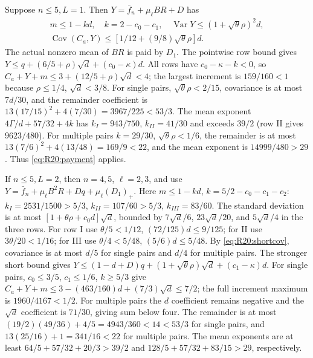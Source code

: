 Suppose $n\le5,L=1$. Then
$Y=\bar f_n+\mu_\ell BR+D$ has
\[
\begin{gathered}
m\le1-kd,\quad k=2-c_0-c_1,\quad \operatorname{Var}Y\le(1+\sqrt\theta\rho)^2d,\\
\operatorname{Cov}(C_a,Y)\le[1/12+(9/8)\sqrt\theta\rho]d.
\end{gathered}
\]
The actual nonzero mean of $BR$ is paid by $D_1$.
The pointwise row bound gives
$Y\le q+(6/5+\rho)\sqrt d+(c_0-\kappa)d$.
All rows have $c_0-\kappa-k<0$, so
$C_a+Y+m\le3+(12/5+\rho)\sqrt d<4$; the largest increment is
$159/160<1$ because $\rho\le1/4$, $\sqrt d<3/8$.
For single pairs, $\sqrt\theta\rho<2/15$, covariance is at most
$7d/30$, and the remainder coefficient is
$13(17/15)^2+4(7/30)=3967/225<53/3$.
The mean exponent $4\Gamma/d+57/32+4k$ has $k_I=943/750$,
$k_{II}=41/30$ and exceeds $39/2$ (row II gives $9623/480$).
For multiple pairs $k=29/30$, $\sqrt\theta\rho<1/6$,
the remainder is at most $13(7/6)^2+4(13/48)=169/9<22$,
and the mean exponent is $14999/480>29$.
Thus \eqref{eq:R20:payment} applies.

If $n\le5,L=2$, then $n=4,5$, $\ell=2,3$, and use
$Y=\bar f_n+\mu_\ell B^2R+Dq+\mu_\ell(D_1)_+$.
Here $m\le1-kd$, $k=5/2-c_0-c_1-c_2$:
$k_I=2531/1500>5/3$, $k_{II}=107/60>5/3$,
$k_{III}=83/60$.
The standard deviation is at most
$[1+\theta\rho+c_0d]\sqrt d$, bounded by
$7\sqrt d/6$, $23\sqrt d/20$, and $5\sqrt d/4$ in the three rows.
For row I use $\theta/5<1/12$, $(72/125)d\le9/125$;
for II use $3\theta/20<1/16$; for III use
$\theta/4<5/48$, $(5/6)d\le5/48$.
By \eqref{eq:R20:shortcov}, covariance is at most $d/5$ for single
pairs and $d/4$ for multiple pairs.
The stronger short bound gives
$Y\le(1-d+D)q+(1+\sqrt\theta\rho)\sqrt d+(c_1-\kappa)d$.
For single pairs, $c_0\le3/5$, $c_1\le1/6$, $k\ge5/3$ give
$C_a+Y+m\le3-(463/160)d+(7/3)\sqrt d\le7/2$;
the full increment maximum is $1960/4167<1/2$.
For multiple pairs the $d$ coefficient remains negative and the
$\sqrt d$ coefficient is $71/30$, giving sum below four.
The remainder is at most
$(19/2)(49/36)+4/5=4943/360<14<53/3$ for single pairs,
and $13(25/16)+1=341/16<22$ for multiple pairs.
The mean exponents are at least
$64/5+57/32+20/3>39/2$ and
$128/5+57/32+83/15>29$, respectively.

